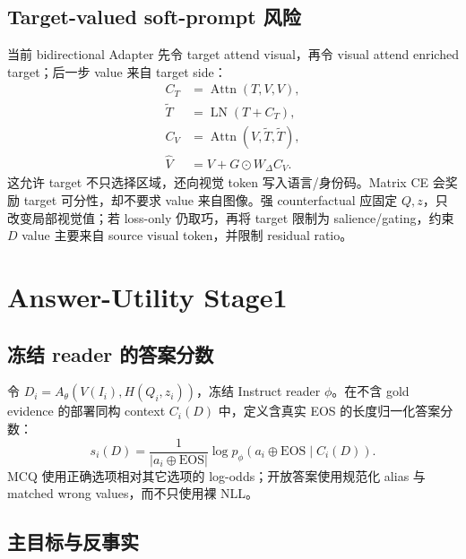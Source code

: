 \documentclass[UTF8,twocolumn,10pt,a4paper]{ctexart}
\begin{document}
\subsection{Target-valued soft-prompt 风险}

当前 bidirectional Adapter 先令 target attend visual，再令 visual attend enriched target；后一步 value 来自 target side：
\begin{align}
 C_T&=\operatorname{Attn}(T,V,V),\\
 \widetilde T&=\operatorname{LN}(T+C_T),\\
 C_V&=\operatorname{Attn}(V,\widetilde T,\widetilde T),\\
 \widehat V&=V+G\odot W_\Delta C_V.
 \label{eq:adapter-risk}
\end{align}
这允许 target 不只选择区域，还向视觉 token 写入语言/身份码。Matrix CE 会奖励 target 可分性，却不要求 value 来自图像。强 counterfactual 应固定 $Q,z$，只改变局部视觉值；若 loss-only 仍取巧，再将 target 限制为 salience/gating，约束 $D$ value 主要来自 source visual token，并限制 residual ratio。

\section{Answer-Utility Stage1}

\subsection{冻结 reader 的答案分数}

令 $D_i=A_\theta(V(I_i),H(Q_i,z_i))$，冻结 Instruct reader $\phi$。在不含 gold evidence 的部署同构 context $C_i(D)$ 中，定义含真实 EOS 的长度归一化答案分数：
\begin{equation}
 s_i(D)=\frac{1}{|a_i\oplus\mathrm{EOS}|}
 \log p_\phi(a_i\oplus\mathrm{EOS}\mid C_i(D)).
 \label{eq:answer-score}
\end{equation}
MCQ 使用正确选项相对其它选项的 log-odds；开放答案使用规范化 alias 与 matched wrong values，而不只使用裸 NLL。

\subsection{主目标与反事实}
\end{document}
